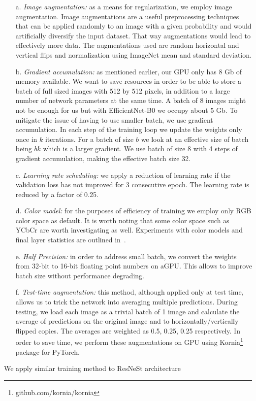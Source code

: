 \documentclass[letterpaper]{article}
\begin{document}
\begin{itemize}
    \item[a.] \emph{Image augmentation:} as a means for regularization, we employ image augmentation. Image augmentations are a useful preprocessing techniques that can be applied randomly to an image with a given probability and would artificially diversify the input dataset. That way augmentations would lead to effectively more data. The augmentations used are random horizontal and vertical flips and normalization using ImageNet mean and standard deviation.
    \item[b.] \emph{Gradient accumulation:} as mentioned earlier, our GPU only has 8 Gb of memory available. We want to save resources in order to be able to store a batch of full sized images with 512 by 512 pixels, in addition to a large number of network parameters at the same time. A batch of 8 images might not be enough for us but with EfficientNet-B0 we occupy about 5 Gb. To mitigate the issue of having to use smaller batch, we use gradient accumulation. In each step of the training loop we update the weights only once in \( k \) iterations. For a batch of size \( b \) we look at an effective size of batch being \( bk \) which is a larger gradient. We use batch of size 8 with 4 steps of gradient accumulation, making the effective batch size 32.
    \item[c.] \emph{Learning rate scheduling:} we apply a reduction of learning rate if the validation loss has not improved for 3 consecutive epoch. The learning rate is reduced by a factor of 0.25.
    \item[d.] \emph{Color model:} for the purposes of efficiency of training we employ only RGB color space as default. It is worth noting that some color space such as YCbCr are worth investigating as well. Experiments with color models and final layer statistics are outlined in~\cite{yousfi2019breaking}.
    \item[e.] \emph{Half Precision:} in order to address small batch, we convert the weights from 32-bit to 16-bit floating point numbers on a\@ GPU\@. This allows to improve batch size without performance degrading.
    \item[f.] \emph{Test-time augmentation:} this method, although applied only at test time, allows us to trick the network into averaging multiple predictions. During testing, we load each image as a trivial batch of 1 image and calculate the average of predictions on the original image and to horizontally/vertically flipped copies. The averages are weighted as 0.5, 0.25, 0.25 respectively. In order to save time, we perform these augmentations on GPU using Kornia\footnote{github.com/kornia/kornia} package for PyTorch.
\end{itemize}
We apply similar training method to ResNeSt architecture
\end{document}
